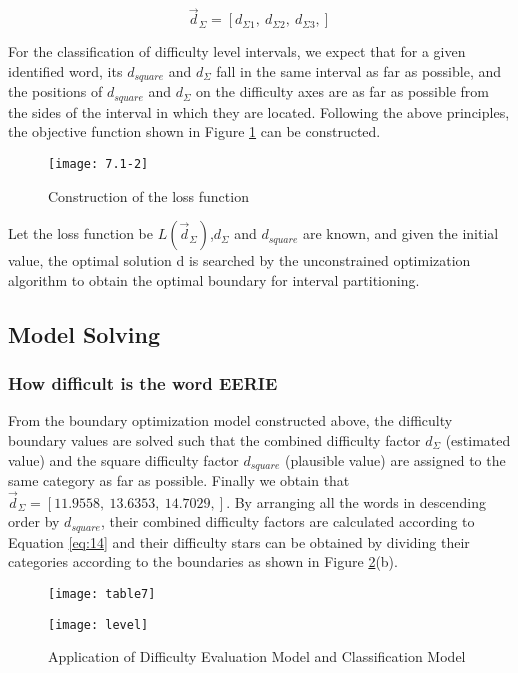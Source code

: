\documentclass[12pt]{mcmthesis}
\begin{document}
\begin{equation}\label{eq:18}
\vec{d}_{\varSigma}=\left[ d_{\varSigma 1},\ d_{\varSigma 2},\ d_{\varSigma 3}, \right]
\end{equation}

For the classification of difficulty level intervals, we expect that for a given identified word, its $ d_{square} $ and $ d_{\varSigma} $ fall in the same interval as far as possible, and the positions of $ d_{square} $ and $ d_{\varSigma} $ on the difficulty axes are as far as possible from the sides of the interval in which they are located. Following the above principles, the objective function shown in Figure \ref{fig:12} can be constructed.
\begin{figure}[h]
	\small
	\centering
	\texttt{[image: 7.1-2]}
	\caption{Construction of the loss function} 
	\label{fig:12}
\end{figure}

Let the loss function be $ L(\vec{d}_{\varSigma}) $,$ d_{\varSigma} $ and $ d_{square} $ are known, and given the initial value, the optimal solution d is searched by the unconstrained optimization algorithm to obtain the optimal boundary for interval partitioning.
\\[0.01pt]
\subsection{Model Solving}
\subsubsection{How difficult is the word EERIE}
\hspace{1.4em}From the boundary optimization model constructed above, the difficulty boundary values are solved such that the combined difficulty factor $ d_{\varSigma} $ (estimated value) and the square difficulty factor $ d_{square} $ (plausible value) are assigned to the same category as far as possible. Finally we obtain that
$ 	\vec{d}_{\varSigma}=\left[  11.9558,\    13.6353,\    14.7029, \right] $.
By arranging all the words in descending order by $ d_{square} $, their combined difficulty factors are calculated according to Equation \ref{eq:14} and their difficulty stars can be obtained by dividing their categories according to the boundaries as shown in Figure \ref{fig:14}(b).
\begin{figure}[h]
	\centering
	\begin{minipage}[c]{0.26\textwidth}
		\centering
		\texttt{[image: table7]}
		\label{fig14_1}
	\end{minipage}
\quad
	\begin{minipage}[c]{0.7\textwidth}
		\centering
		\texttt{[image: level]}
		\label{fig14_2}
	\end{minipage}
	\caption{Application of Difficulty Evaluation Model and Classification Model}
	\label{fig:14}
\end{figure}
\end{document}
